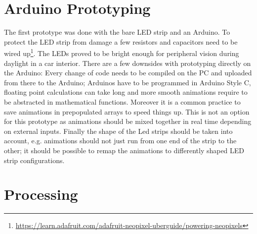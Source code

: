 \section{Arduino Prototyping}
The first prototype was done with the bare LED strip and an Arduino. To protect the LED strip from damage a few resistors and capacitors need to be wired up\footnote{\url{https://learn.adafruit.com/adafruit-neopixel-uberguide/powering-neopixels}}.  The LEDs proved to be bright enough for peripheral vision during daylight in a car interior. There are a few downsides with prototyping directly on the Arduino: Every change of code needs to be compiled on the PC and uploaded from there to the Arduino; Arduinos have to be programmed in Arduino Style C, floating point calculations can take long and more smooth animations require to be abstracted in mathematical functions. Moreover it is a common practice to save  animations in prepopulated arrays to speed things up. This is not an option for this prototype as animations should be mixed together in real time depending on external inputs. Finally the shape of the Led strips should be taken into account, e.g. animations should not just run from one end of the strip to the other; it should be possible to remap the animations to differently shaped LED strip configurations. 

\section{Processing}


